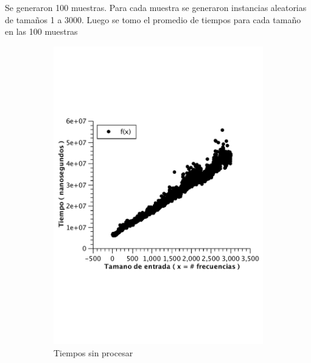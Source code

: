 Se generaron 100 muestras. Para cada muestra se generaron instancias aleatorias de tamaños 1 a 3000.
Luego se tomo el promedio de tiempos para cada tamaño en las 100 muestras

\begin{figure}[H]
        \centering
        \begin{subfigure}[b]{0.5\textwidth}
                \includegraphics[width=\textwidth]{imagenes/af-rand-nlogn.pdf}
                \caption{Tiempos sin procesar}
        \end{subfigure}%
        ~ %
        \begin{subfigure}[b]{0.5\textwidth}

\end{subfigure}
\end{figure}
